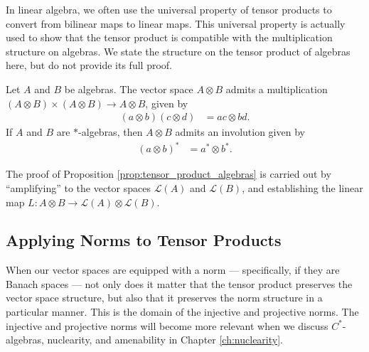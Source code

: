 In linear algebra, we often use the universal property of tensor products to convert from bilinear maps to linear maps. This universal property is actually used to show that the tensor product is compatible with the multiplication structure on algebras. We state the structure on the tensor product of algebras here, but do not provide its full proof.
\begin{proposition}\label{prop:tensor_product_algebras}
  Let $A$ and $B$ be algebras. The vector space $A\otimes B$ admits a multiplication $\left( A\otimes B \right)\times \left( A\otimes B \right)\rightarrow A\otimes B$, given by
  \begin{align*}
    \left( a\otimes b \right)\left( c\otimes d \right) &= ac\otimes bd.
  \end{align*}
  If $A$ and $B$ are $\ast$-algebras, then $A\otimes B$ admits an involution given by
  \begin{align*}
    \left( a\otimes b \right)^{\ast} &= a^{\ast}\otimes b^{\ast}.
  \end{align*}
\end{proposition}
The proof of Proposition \ref{prop:tensor_product_algebras} is carried out by ``amplifying'' to the vector spaces $\mathcal{L}\left( A \right)$ and $\mathcal{L}\left( B \right)$, and establishing the linear map $L\colon A\otimes B \rightarrow \mathcal{L}\left( A \right)\otimes \mathcal{L}\left( B \right)$.
\subsection{Applying Norms to Tensor Products}%
When our vector spaces are equipped with a norm --- specifically, if they are Banach spaces --- not only does it matter that the tensor product preserves the vector space structure, but also that it preserves the norm structure in a particular manner. This is the domain of the injective and projective norms. The injective and projective norms will become more relevant when we discuss $C^{\ast}$-algebras, nuclearity, and amenability in Chapter \ref{ch:nuclearity}.\newline
 

